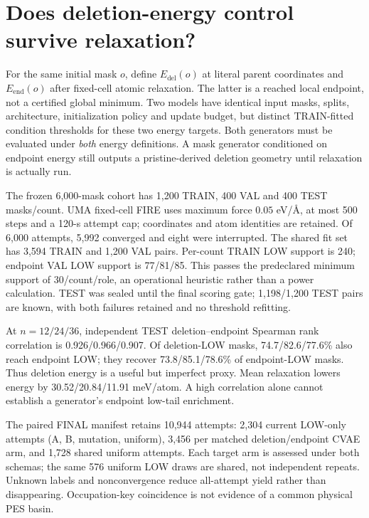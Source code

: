 \documentclass[10pt]{article}
\begin{document}
\section{Does deletion-energy control survive relaxation?}
For the same initial mask $o$, define $E_{\mathrm{del}}(o)$ at literal parent
coordinates and $E_{\mathrm{end}}(o)$ after fixed-cell atomic relaxation.
The latter is a reached local endpoint, not a certified global minimum. Two
models have identical input masks, splits, architecture, initialization
policy and update budget, but distinct TRAIN-fitted condition thresholds for
these two energy targets. Both generators must be evaluated under \emph{both}
energy definitions. A mask generator conditioned on endpoint energy still
outputs a pristine-derived deletion geometry until relaxation is actually run.

The frozen 6,000-mask cohort has 1,200 TRAIN, 400 VAL and 400 TEST masks/count.
UMA fixed-cell FIRE uses maximum force $0.05$ eV/\AA, at most 500 steps and a
120-s attempt cap; coordinates and atom identities are retained. Of 6,000
attempts, 5,992 converged and eight were interrupted. The shared fit set has
3,594 TRAIN and 1,200 VAL pairs. Per-count TRAIN LOW support is 240; endpoint
VAL LOW support is 77/81/85. This passes the predeclared minimum support of
30/count/role, an operational heuristic rather than a power calculation.
TEST was sealed until the final scoring gate; 1,198/1,200 TEST pairs are known,
with both failures retained and no threshold refitting.

At $n=12/24/36$, independent TEST deletion--endpoint Spearman rank correlation
is 0.926/0.966/0.907. Of deletion-LOW masks, 74.7/82.6/77.6\% also reach
endpoint LOW; they recover 73.8/85.1/78.6\% of endpoint-LOW masks. Thus deletion
energy is a useful but imperfect proxy. Mean relaxation lowers energy by
30.52/20.84/11.91 meV/atom. A high correlation alone cannot establish a
generator's endpoint low-tail enrichment.



The paired FINAL manifest retains 10,944 attempts: 2,304 current LOW-only attempts
(A, B, mutation, uniform), 3,456 per matched deletion/endpoint CVAE arm, and
1,728 shared uniform attempts. Each target arm is assessed under both schemas;
the same 576 uniform LOW draws are shared, not independent repeats. Unknown
labels and nonconvergence reduce all-attempt yield rather than disappearing.
Occupation-key coincidence is not evidence of a common physical PES basin.
\end{document}
